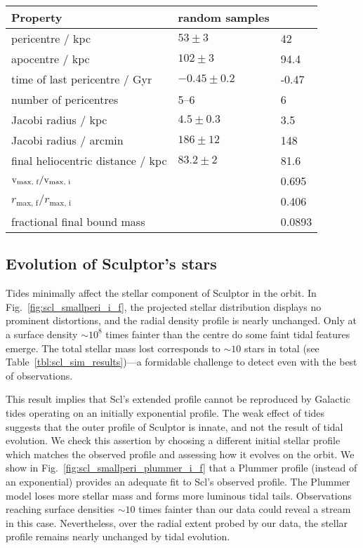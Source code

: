 \begin{table*}[t]
\centering
\caption[Simulation results for Sculptor’s dark matter]{The orbital and dark matter properties for the simulation of Sculptor. The random samples column shows the distributions from point orbits, and the \smallperi{} column contains the results from the N-body simulation. }
\label{tbl:scl_sim_results}
\begin{tabular}{lll}
\toprule
Property & random samples & \smallperi{}\\
\midrule
pericentre $/$ kpc & $53\pm3$ & 42\\
apocentre $/$ kpc & $102\pm3$ & 94.4\\
time of last pericentre $/$ Gyr & $-0.45 \pm 0.2$ & -0.47\\
number of pericentres & 5–6 & 6\\
Jacobi radius $/$ kpc & $4.5 \pm 0.3$ & 3.5\\
Jacobi radius $/$ arcmin & $186\pm12$ & 148\\
final heliocentric distance $/$ kpc & $83.2\pm2$ & 81.6\\
${\rm v}_\textrm{max, f} / {\rm v}_\textrm{max, i}$ &  & 0.695\\
$r_\textrm{max, f} / r_\textrm{max, i}$ &  & 0.406\\
fractional final bound mass &  & 0.0893\\
\bottomrule
\end{tabular}
\end{table*}

\subsection{Evolution of Sculptor's stars}\label{sec:scl_sim_stars}

Tides minimally affect the stellar component of Sculptor in the
\smallperi{} orbit. In Fig.~\ref{fig:scl_smallperi_i_f}, the projected
stellar distribution displays no prominent distortions, and the radial
density profile is nearly unchanged. Only at a surface density
\(\sim10^8\) times fainter than the centre do some faint tidal features
emerge. The total stellar mass lost corresponds to \(\sim 10\) stars in
total (see Table~\ref{tbl:scl_sim_results})---a formidable challenge to
detect even with the best of observations.

This result implies that Scl's extended profile cannot be reproduced by
Galactic tides operating on an initially exponential profile. The weak
effect of tides suggests that the outer profile of Sculptor is innate,
and not the result of tidal evolution. We check this assertion by
choosing a different initial stellar profile which matches the observed
profile and assessing how it evolves on the \smallperi{} orbit. We show
in Fig.~\ref{fig:scl_smallperi_plummer_i_f} that a Plummer profile
(instead of an exponential) provides an adequate fit to Scl's observed
profile. The Plummer model loses more stellar mass and forms more
luminous tidal tails. Observations reaching surface densities \(\sim10\)
times fainter than our data could reveal a stream in this case.
Nevertheless, over the radial extent probed by our data, the stellar
profile remains nearly unchanged by tidal evolution.

